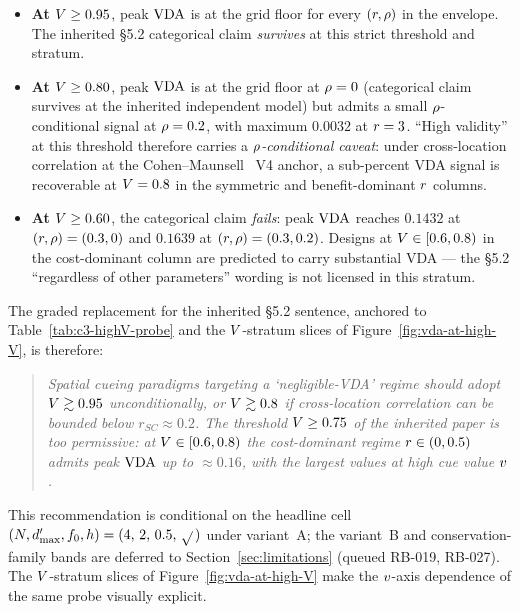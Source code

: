 \begin{itemize}
  \item \textbf{At $V \ge 0.95$}, peak $\mathrm{VDA}$ is at the grid
        floor for every $(r, \rho)$ in the envelope. The
        inherited §5.2 categorical claim \emph{survives} at this
        strict threshold and stratum.
  \item \textbf{At $V \ge 0.80$}, peak $\mathrm{VDA}$ is at the grid
        floor at $\rho = 0$ (categorical claim survives at the
        inherited independent model) but admits a small
        $\rho$-conditional signal at $\rho = 0.2$, with maximum
        $0.0032$ at $r = 3$. ``High validity'' at this
        threshold therefore carries a \emph{$\rho$-conditional
        caveat}: under cross-location correlation at the
        Cohen--Maunsell~\cite{CohenMaunsell2009} V4 anchor, a
        sub-percent VDA signal is recoverable at $V = 0.8$ in
        the symmetric and benefit-dominant $r$ columns.
  \item \textbf{At $V \ge 0.60$}, the categorical claim
        \emph{fails}: peak $\mathrm{VDA}$ reaches $0.1432$ at $(r,
        \rho) = (0.3, 0)$ and $0.1639$ at $(r, \rho) = (0.3,
        0.2)$. Designs at $V \in [0.6, 0.8)$ in the
        cost-dominant column are predicted to carry substantial VDA
        --- the §5.2 ``regardless of other parameters'' wording is
        not licensed in this stratum.
\end{itemize}
%
The graded replacement for the inherited §5.2 sentence, anchored to
Table~\ref{tab:c3-highV-probe} and the $V$-stratum slices of
Figure~\ref{fig:vda-at-high-V}, is therefore:
%
\begin{quote}
  \emph{Spatial cueing paradigms targeting a `negligible-VDA' regime
  should adopt $V \gtrsim 0.95$ unconditionally, or $V
  \gtrsim 0.8$ if cross-location correlation can be bounded below
  $r_{SC} \approx 0.2$. The threshold $V \ge 0.75$ of the
  inherited paper is too permissive: at $V \in [0.6, 0.8)$ the
  cost-dominant regime $r \in (0, 0.5)$ admits peak $\mathrm{VDA}$ up
  to $\approx 0.16$, with the largest values at high cue value
  $v$.}
\end{quote}
%
This recommendation is conditional on the headline cell $(N,
d'_{\max}, f_0, h) = (4,\,2,\,0.5,\,\sqrt{}\,)$ under variant~A;
the variant~B and conservation-family bands are deferred to
Section~\ref{sec:limitations} (queued RB-019, RB-027). The
$V$-stratum slices of Figure~\ref{fig:vda-at-high-V} make the
$v$-axis dependence of the same probe visually explicit.
